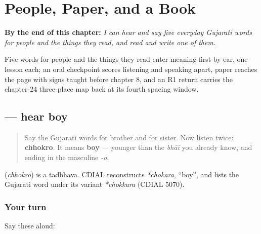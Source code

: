 
\chapter{People, Paper, and a Book}
\label{ch:gu-people-paper-book}

\begin{chapteropening}
\textbf{By the end of this chapter:} \emph{I can hear and say five everyday Gujarati words for people and the things they read, and read and write one of them.}

Five words for people and the things they read enter meaning-first by ear, one lesson each; an oral checkpoint scores listening and speaking apart, paper reaches the page with signs taught before chapter 8, and an R1 return carries the chapter-24 three-place map back at its fourth spacing window.
\end{chapteropening}

\section[\texorpdfstring{\gu{છોકરો} (chhokro)}{છોકરો (chhokro)}]{ — hear boy}

\label{lesson:GU-C30-hear-chhokro}



\begin{quote}
Say the Gujarati words for brother and for sister. Now listen twice: \textbf{chhokro}. It means \textbf{boy} — younger than the \emph{bhāī} you already know, and ending in the masculine \emph{-o}.
\end{quote}

\begin{cousinweb}
\textbf{} (\emph{chhokro}) is a tadbhava. CDIAL reconstructs \emph{*chokara}, \textquotedblleft{}boy\textquotedblright{}, and lists the Gujarati word under its variant \emph{*chokkara} (CDIAL 5070).
\end{cousinweb}

\subsection*{Your turn}
Say these aloud:

